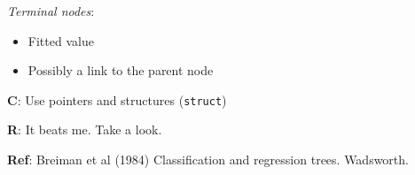 \emph{Terminal nodes}:
\begin{itemize}
\item Fitted value
\item Possibly a link to the parent node
\end{itemize}


\textbf{C}: Use pointers and structures (\verb|struct|)


\textbf{R}: It beats me.  Take a look.




\textbf{Ref}: Breiman et al (1984) Classification and regression
trees.  Wadsworth.
